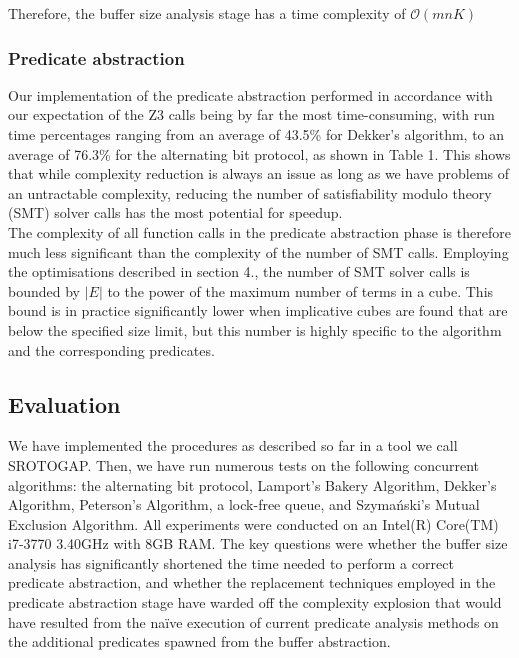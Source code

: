 Therefore, the buffer size analysis stage has a time complexity of $\mathcal{O}(mnK)$

\subsubsection{Predicate abstraction}

Our implementation of the predicate abstraction performed in accordance with our expectation of the Z3 \cite{z3} calls being by far the most time-consuming, with run time percentages ranging from an average of 43.5\% for Dekker's algorithm, to an average of 76.3\% for the alternating bit protocol, as shown in Table 1. This shows that while complexity reduction is always an issue as long as we have problems of an untractable complexity, reducing the number of satisfiability modulo theory (SMT) solver calls has the most potential for speedup.\\

The complexity of all function calls in the predicate abstraction phase is therefore much less significant than the complexity of the number of SMT calls. Employing the optimisations described in section 4., the number of SMT solver calls is bounded by $|E|$ to the power of the maximum number of terms in a cube. This bound is in practice significantly lower when implicative cubes are found that are below the specified size limit, but this number is highly specific to the algorithm and the corresponding predicates.

\subsection{Evaluation}

We have implemented the procedures as described so far in a tool we call SROTOGAP. Then, we have run numerous tests on the following concurrent algorithms: the alternating bit protocol, Lamport's Bakery Algorithm, Dekker's Algorithm, Peterson's Algorithm, a lock-free queue, and Szyma\'nski's Mutual Exclusion Algorithm. All experiments were conducted on an Intel(R) Core(TM) i7-3770 3.40GHz with 8GB RAM. The key questions were whether the buffer size analysis has significantly shortened the time needed to perform a correct predicate abstraction, and whether the replacement techniques employed in the predicate abstraction stage have warded off the complexity explosion that would have resulted from the na\"ive execution of current predicate analysis methods on the additional predicates spawned from the buffer abstraction.\\

